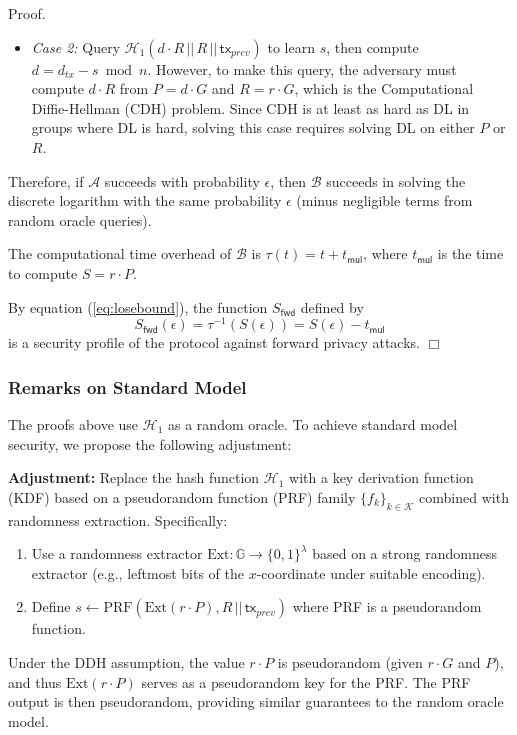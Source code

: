 \documentclass{article}
\newenvironment{proof}{\textsf{Proof}.}{\hfill$\Box$}
\begin{document}
\begin{proof}
\begin{itemize}
\item \textit{Case 2:} Query $\mathcal{H}_1(d \cdot R \,||\, R \,||\, \mathsf{tx}_{prev})$ to learn $s$, then compute $d = d_{tx} - s \bmod n$. However, to make this query, the adversary must compute $d \cdot R$ from $P = d \cdot G$ and $R = r \cdot G$, which is the Computational Diffie-Hellman (CDH) problem. Since CDH is at least as hard as DL in groups where DL is hard, solving this case requires solving DL on either $P$ or $R$.
\end{itemize}

Therefore, if $\mathcal{A}$ succeeds with probability $\epsilon$, then $\mathcal{B}$ succeeds in solving the discrete logarithm with the same probability $\epsilon$ (minus negligible terms from random oracle queries).

The computational time overhead of $\mathcal{B}$ is $\tau(t) = t + t_\mathsf{mul}$, where $t_\mathsf{mul}$ is the time to compute $S = r \cdot P$.

By equation (\ref{eq:losebound}), the function $S_\mathsf{fwd}$ defined by
\[
S_\mathsf{fwd}(\epsilon) = \tau^{-1}(S(\epsilon)) = S(\epsilon) - t_\mathsf{mul}
\]
is a security profile of the protocol against forward privacy attacks.
\end{proof}

\subsubsection{Remarks on Standard Model}

The proofs above use $\mathcal{H}_1$ as a random oracle. To achieve standard model security, we propose the following adjustment:

\textbf{Adjustment:} Replace the hash function $\mathcal{H}_1$ with a key derivation function (KDF) based on a pseudorandom function (PRF) family $\{f_k\}_{k \in \mathcal{K}}$ combined with randomness extraction. Specifically:
\begin{enumerate}
\item Use a randomness extractor $\text{Ext} \colon \mathbb{G} \to \{0,1\}^\lambda$ based on a strong randomness extractor (e.g., leftmost bits of the $x$-coordinate under suitable encoding).
\item Define $s \leftarrow \text{PRF}(\text{Ext}(r \cdot P), R \,||\, \mathsf{tx}_{prev})$ where PRF is a pseudorandom function.
\end{enumerate}

Under the DDH assumption, the value $r \cdot P$ is pseudorandom (given $r \cdot G$ and $P$), and thus $\text{Ext}(r \cdot P)$ serves as a pseudorandom key for the PRF. The PRF output is then pseudorandom, providing similar guarantees to the random oracle model.
\end{document}
